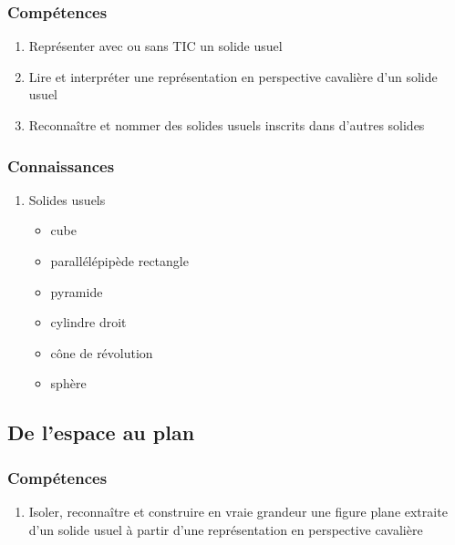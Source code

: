 \documentclass[12pt,a4paper]{article}
\begin{document}
	\subsubsection*{Compétences}
	\begin{enumerate}
		\item Représenter avec ou sans TIC un solide usuel
		\item Lire et interpréter une représentation en perspective cavalière d'un solide usuel
		\item Reconnaître et nommer des solides usuels inscrits dans d'autres solides
	\end{enumerate}
	
	\subsubsection*{Connaissances}

	\begin{enumerate}
		\item Solides usuels
		\begin{itemize}
			\item cube
			\item parallélépipède rectangle
			\item pyramide
			\item cylindre droit
			\item cône de révolution
			\item sphère
		\end{itemize}
	\end{enumerate}

\subsection{De l'espace au plan}
	\subsubsection*{Compétences}
	\begin{enumerate}
		\item Isoler, reconnaître et construire en vraie grandeur une figure plane extraite d'un solide usuel à partir d'une représentation en perspective cavalière

	\end{enumerate}
	
\end{document}
